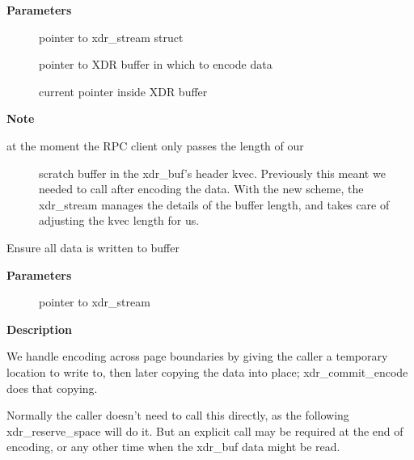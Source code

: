 \documentclass[a4paper,8pt,english]{sphinxmanual}
\begin{document}
\textbf{Parameters}
\begin{description}
\item[{}] \leavevmode
pointer to xdr\_stream struct

\item[{}] \leavevmode
pointer to XDR buffer in which to encode data

\item[{}] \leavevmode
current pointer inside XDR buffer

\end{description}

\textbf{Note}
\begin{description}
\item[{at the moment the RPC client only passes the length of our}] \leavevmode
scratch buffer in the xdr\_buf's header kvec. Previously this
meant we needed to call  after encoding the
data. With the new scheme, the xdr\_stream manages the details
of the buffer length, and takes care of adjusting the kvec
length for us.

\end{description}

\begin{fulllineitems}
\label{networking/kapi:c.xdr_commit_encode}
Ensure all data is written to buffer

\end{fulllineitems}


\textbf{Parameters}
\begin{description}
\item[{}] \leavevmode
pointer to xdr\_stream

\end{description}

\textbf{Description}

We handle encoding across page boundaries by giving the caller a
temporary location to write to, then later copying the data into
place; xdr\_commit\_encode does that copying.

Normally the caller doesn't need to call this directly, as the
following xdr\_reserve\_space will do it.  But an explicit call may be
required at the end of encoding, or any other time when the xdr\_buf
data might be read.
\end{document}
